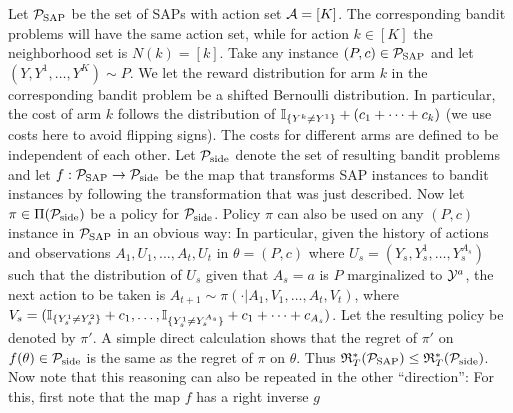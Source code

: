 Let $\mathcal{P}_{\mathrm{SAP}}$ be the set of SAPs with action set $\mathcal{A} = [K]$.
The corresponding bandit problems will have the same action set,
while for action $k\in [K]$ the neighborhood set is $N(k) = [k]$.
Take any instance $(P,c)\in \mathcal{P}_{\mathrm{SAP}}$ and let $(Y,Y^1,\dots,Y^K) \sim P$.
We let the reward distribution for arm $k$ in the corresponding bandit problem
be a shifted Bernoulli distribution.
In particular, the cost of arm $k$ follows the distribution of 
$\mathbb{I}_{\{Y^k\ne Y^1\}} + (c_1+\dots+c_k)$ (we use costs here to avoid flipping signs).
The costs for different arms are defined to be independent of each other.
Let $\mathcal{P}_{\mathrm{side}}$ denote the set of resulting bandit problems and let $f:\mathcal{P}_{\mathrm{SAP}} \to \mathcal{P}_{\mathrm{side}}$
be the map that transforms SAP instances to bandit instances by following the
transformation that was just described.
Now let $\pi\in \Pi(\mathcal{P}_{\mathrm{side}})$ be a policy for $\mathcal{P}_{\mathrm{side}}$.
Policy $\pi$ can also be used on any $(P,c)$ instance in $\mathcal{P}_{\mathrm{SAP}}$ in an obvious way:
In particular, given the history of actions and observations $A_1,U_1,\dots,A_t,U_t$
in $\theta=(P,c)$ where $U_s = (Y_s,Y_s^1,\dots,Y_s^{A_s})$ such that 
the distribution of $U_s$ given that $A_s=a$ is $P$ marginalized to $\mathcal{Y}^{a}$,
the next action to be taken is 
$A_{t+1}\sim \pi(\cdot| A_1, V_1,\dots,A_t,V_t)$, where
$V_s = (\mathbb{I}_{\{Y_s^1\ne Y_s^2\}}+c_1,\dots,\mathbb{I}_{\{Y_s^1\ne Y_s^{A_s}\}}+c_1+\dots+c_{A_s})$. Let the resulting policy be denoted by $\pi'$.
A simple direct calculation shows that the regret of $\pi'$ on $f(\theta)\in \mathcal{P}_{\mathrm{side}}$
is the same as the regret of $\pi$ on $\theta$. 
Thus $\mathfrak{R}_T^*(\mathcal{P}_{\mathrm{SAP}})\le \mathfrak{R}_T^*(\mathcal{P}_{\mathrm{side}})$.
Now note that this reasoning can also be repeated in the other ``direction'': 
For this, first note that the map $f$ has a right inverse $g$ 
